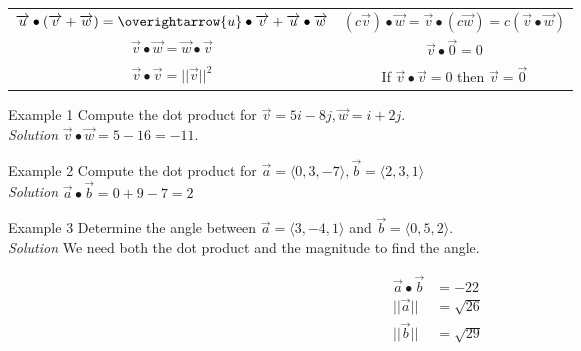         \begin{center}
            \begin{tabular} {c|c}
                $\overrightarrow{u}\bullet(\overrightarrow{v}+\overrightarrow{w})
                =\overightarrow{u}\bullet\overrightarrow{v}+\overrightarrow{u}\bullet\overrightarrow{w}$
                & $(c\overrightarrow{v})\bullet\overrightarrow{w}
                =\overrightarrow{v}\bullet(c\overrightarrow{w})
                =c(\overrightarrow{v}\bullet\overrightarrow{w})$ \\
                $\overrightarrow{v}\bullet\overrightarrow{w}
                =\overrightarrow{w}\bullet\overrightarrow{v}$
                & $\overrightarrow{v}\bullet\overrightarrow{0}=0$\\
                $\overrightarrow{v}\bullet\overrightarrow{v}=||\overrightarrow{v}||^2$
                & If $\overrightarrow{v}\bullet\overrightarrow{v}=0$ then
                $\overrightarrow{v}=\overrightarrow{0}$
            \end{tabular}
        \end{center}

        \noindent \color{blue} Example 1 \color{black} Compute the dot product for
        $\overrightarrow{v}=5i-8j, \overrightarrow{w}=i+2j$.\\

        \noindent \textit{Solution} $\overrightarrow{v}\bullet\overrightarrow{w}=5-16=-11$.

        \noindent \color{blue} Example 2 \color{black} Compute the dot product for
        $\overrightarrow{a}=\langle0,3,-7\rangle, \overrightarrow{b}=\langle 2,3,1\rangle$\\

        \noindent \textit{Solution} $\overrightarrow{a}\bullet\overrightarrow{b}=0+9-7=2$

        \noindent \color{blue} Example 3 \color{black} Determine the angle between
        $\overrightarrow{a}=\langle 3,-4,1\rangle$ and $\overrightarrow{b}=\langle 0,5,2\rangle$.\\
        \textit{Solution} We need both the dot product and the magnitude to find the angle.

        \begin{align*}
            \overrightarrow{a}\bullet\overrightarrow{b} &= -22\\
            ||\overrightarrow{a}|| &= \sqrt{26}\\
            ||\overrightarrow{b}|| &= \sqrt{29}
        \end{align*}

